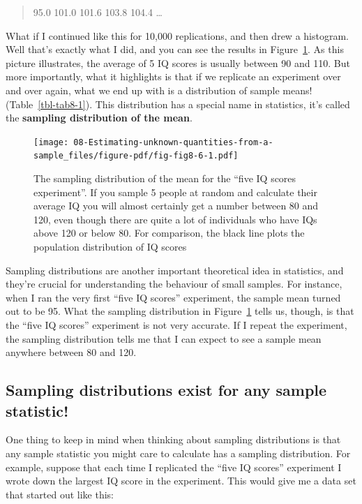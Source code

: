 \documentclass[
  a4paper,
]{book}
\begin{document}
\begin{quote}
95.0 101.0 101.6 103.8 104.4 \ldots{}
\end{quote}

What if I continued like this for 10,000 replications, and then drew a
histogram. Well that's exactly what I did, and you can see the results
in Figure~\ref{fig-fig8-6}. As this picture illustrates, the average of
5 IQ scores is usually between 90 and 110. But more importantly, what it
highlights is that if we replicate an experiment over and over again,
what we end up with is a distribution of sample means!
(Table~\ref{tbl-tab8-1}). This distribution has a special name in
statistics, it's called the \textbf{sampling distribution of the mean}.

\begin{figure}

\texttt{[image: 08-Estimating-unknown-quantities-from-a-sample\_files/figure-pdf/fig-fig8-6-1.pdf]} \hfill{}

\caption{\label{fig-fig8-6}The sampling distribution of the mean for the
``five IQ scores experiment''. If you sample 5 people at random and
calculate their average IQ you will almost certainly get a number
between 80 and 120, even though there are quite a lot of individuals who
have IQs above 120 or below 80. For comparison, the black line plots the
population distribution of IQ scores}

\end{figure}

Sampling distributions are another important theoretical idea in
statistics, and they're crucial for understanding the behaviour of small
samples. For instance, when I ran the very first ``five IQ scores''
experiment, the sample mean turned out to be 95. What the sampling
distribution in Figure~\ref{fig-fig8-6} tells us, though, is that the
``five IQ scores'' experiment is not very accurate. If I repeat the
experiment, the sampling distribution tells me that I can expect to see
a sample mean anywhere between 80 and 120.

\hypertarget{sampling-distributions-exist-for-any-sample-statistic}{%
\subsection{Sampling distributions exist for any sample
statistic!}\label{sampling-distributions-exist-for-any-sample-statistic}}

One thing to keep in mind when thinking about sampling distributions is
that any sample statistic you might care to calculate has a sampling
distribution. For example, suppose that each time I replicated the
``five IQ scores'' experiment I wrote down the largest IQ score in the
experiment. This would give me a data set that started out like this:
\end{document}
